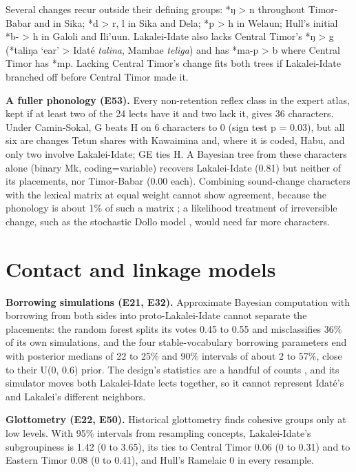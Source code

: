 \documentclass[11pt]{article}
\begin{document}
Several changes recur outside their defining groups: *ŋ \textgreater{} n throughout Timor-Babar and in Sika; *d \textgreater{} r, l in Sika and Dela; *p \textgreater{} h in Welaun; Hull's initial *b- \textgreater{} h in Galoli and Ili'uun. Lakalei-Idate also lacks Central Timor's *ŋ \textgreater{} g (*taliŋa `ear' \textgreater{} Idaté \emph{talina}, Mambae \emph{teliga}) and has *ma-p \textgreater{} b where Central Timor has *mp. Lacking Central Timor's change fits both trees if Lakalei-Idate branched off before Central Timor made it.

\textbf{A fuller phonology (E53).} Every non-retention reflex class in the expert atlas, kept if at least two of the 24 lects have it and two lack it, gives 36 characters. Under Camin-Sokal, G beats H on 6 characters to 0 (sign test p = 0.03), but all six are changes Tetun shares with Kawaimina and, where it is coded, Habu, and only two involve Lakalei-Idate; GE ties H. A Bayesian tree from these characters alone (binary Mk, coding=variable) recovers Lakalei-Idate (0.81) but neither of its placements, nor Timor-Babar (0.00 each). Combining sound-change characters with the lexical matrix at equal weight cannot show agreement, because the phonology is about 1\% of such a matrix \citep[on weighting character types, see][]{ringe2002}; a likelihood treatment of irreversible change, such as the stochastic Dollo model \citep{nicholls2008}, would need far more characters.

\section{Contact and linkage models}\label{sec:contact}

\textbf{Borrowing simulations (E21, E32).} Approximate Bayesian computation \citep{csillery2010} with borrowing from both sides into proto-Lakalei-Idate cannot separate the placements: the random forest \citep{pudlo2016} splits its votes 0.45 to 0.55 and misclassifies 36\% of its own simulations, and the four stable-vocabulary borrowing parameters end with posterior medians of 22 to 25\% and 90\% intervals of about 2 to 57\%, close to their U(0, 0.6) prior. The design's statistics are a handful of counts \citep{robert2011}, and its simulator moves both Lakalei-Idate lects together, so it cannot represent Idaté's and Lakalei's different neighbors.

\textbf{Glottometry (E22, E50).} Historical glottometry \citep{kalyan2018} finds cohesive groups only at low levels. With 95\% intervals from resampling concepts, Lakalei-Idate's subgroupiness is 1.42 (0 to 3.65), its ties to Central Timor 0.06 (0 to 0.31) and to Eastern Timor 0.08 (0 to 0.41), and Hull's Ramelaic 0 in every resample.
\end{document}
